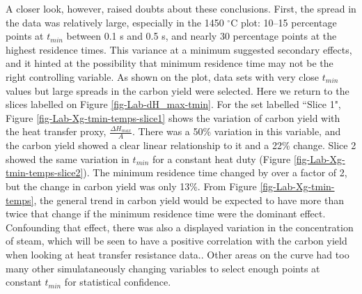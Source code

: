 \documentclass[11pt,twocolumn]{article}
\begin{document}


A closer look, however, raised doubts about these conclusions.  First, the spread in the data was relatively large, especially in the 1450 $^{\circ}$C plot: 10--15 percentage points at $t_{min}$ between 0.1 s and 0.5 s, and nearly 30 percentage points at the highest residence times.  This variance at a minimum suggested secondary effects, and it hinted at the possibility that minimum residence time may not be the right controlling variable.  As shown on the plot, data sets with very close $t_{min}$ values but large spreads in the carbon yield were selected.  Here we return to the slices labelled on Figure \ref{fig-Lab-dH_max-tmin}.  For the set labelled ``Slice 1", Figure \ref{fig-Lab-Xg-tmin-temps-slice1} shows the variation of carbon yield with the heat transfer proxy, $\frac{\Delta H_{max}}{A}$.  There was a 50\% variation in this variable, and the carbon yield showed a clear linear relationship to it and a 22\% change.  Slice 2 showed the same variation in $t_{min}$ for a constant heat duty (Figure \ref{fig-Lab-Xg-tmin-temps-slice2}).  The minimum residence time changed by over a factor of 2, but the change in carbon yield was only 13\%.  From Figure \ref{fig-Lab-Xg-tmin-temps}, the general trend in carbon yield would be expected to have more than twice that change if the minimum residence time were the dominant effect.  Confounding that effect, there was also a displayed variation in the concentration of steam, which will be seen to have a positive correlation with the carbon yield when looking at heat transfer resistance data..  Other areas on the curve had too many other simulataneously changing variables to select enough points at constant $t_{min}$ for statistical confidence.
\end{document}
